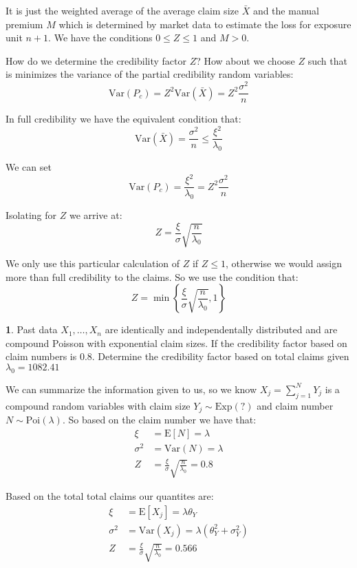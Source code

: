 \documentclass[english,12pt]{article}
\theoremstyle{plain}
\theoremstyle{definition}
\newtheorem*{example}{\protect\examplename}
\theoremstyle{definition} %
\providecommand{\examplename}{Example}
\newcommand{\ex}[1]{\mbox{E} \left[ #1 \right]}
\newcommand{\var}[1]{\mbox{Var} \left( #1 \right)}
\begin{document}
It is just the weighted average of the average claim size $\bar{X}$ and the manual premium $M$ which is determined by market data to estimate the loss for exposure unit $n+1$.  We have the conditions $0\le Z\le 1$ and $M>0$.

How do we determine the credibility factor $Z$?  How about we choose $Z$ such that is minimizes the variance of the partial credibility random variables:
\[\var{P_c}=Z^2\var{\bar{X}}=Z^2\frac{\sigma^2}{n}\]

In full credibility we have the equivalent condition that:
\[\var{\bar{X}}=\frac{\sigma^2}{n}\le\frac{\xi^2}{\lambda_0}\]

We can set
\[\var{P_c}=\frac{\xi^2}{\lambda_0}=Z^2\frac{\sigma^2}{n}\]

Isolating for $Z$ we arrive at:
\[Z=\frac{\xi}{\sigma}\sqrt{\frac{n}{\lambda_0}}\]

We only use this particular calculation of $Z$ if $Z\le 1$, otherwise we would assign more than full credibility to the claims.  So we use the condition that:
\[Z=\min\left\{\frac{\xi}{\sigma}\sqrt{\frac{n}{\lambda_0}},1\right\}\]

\begin{example}
Past data $X_1,\ldots,X_n$ are identically and independentally distributed and are compound Poisson with exponential claim sizes.  If the credibility factor based on claim numbers is $0.8$.  Determine the credibility factor based on total claims given $\lambda_0=1082.41$

We can summarize the information given to us, so we know $X_j=\sum\limits_{j=1}^NY_j$ is a compound random variables with claim size $Y_j\sim \text{Exp}(?)$ and claim number $N\sim \text{Poi}(\lambda)$.  So based on the claim number we have that:
\begin{align*}
\xi&=\ex{N}=\lambda\\
\sigma^2&=\var{N}=\lambda\\
Z&=\frac{\xi}{\sigma}\sqrt{\frac{n}{\lambda_0}}=0.8
\end{align*}

Based on the total total claims our quantites are:
\begin{align*}
\xi&=\ex{X_j}=\lambda\theta_Y\\
\sigma^2&=\var{X_j}=\lambda(\theta_Y^2+\sigma_Y^2)\\
Z&=\frac{\xi}{\sigma}\sqrt{\frac{n}{\lambda_0}}=0.566
\end{align*}
\end{example}
\end{document}
